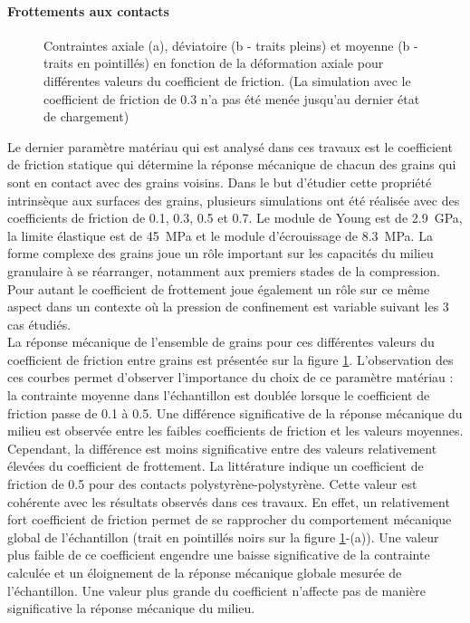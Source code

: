 	\paragraph{Frottements aux contacts\\}
		\begin{figure}\centering
			\hfill
			\caption{\label{fig06:material_effect_friction}Contraintes axiale (a), déviatoire (b - traits pleins) et moyenne (b - traits en pointillés) en fonction de la déformation axiale pour différentes valeurs du coefficient de friction. (La simulation avec le coefficient de friction de \num{0.3} n'a pas été menée jusqu'au dernier état de chargement)}
		\end{figure}
		Le dernier paramètre matériau qui est analysé dans ces travaux est le coefficient de friction statique qui détermine la réponse mécanique de chacun des grains qui sont en contact avec des grains voisins. Dans le but d'étudier cette propriété intrinsèque aux surfaces des grains, plusieurs simulations ont été réalisée avec des coefficients de friction de \num{0.1}, \num{0.3}, \num{0.5} et \num{0.7}. Le module de Young est de \SI{2.9}{\giga\pascal}, la limite élastique est de \SI{45}{\mega\pascal} et le module d'écrouissage de \SI{8.3}{\mega\pascal}. La forme complexe des grains joue un rôle important sur les capacités du milieu granulaire à se réarranger, notamment aux premiers stades de la compression. Pour autant le coefficient de frottement joue également un rôle sur ce même aspect dans un contexte où la pression de confinement est variable suivant les 3 cas étudiés.
		\\La réponse mécanique de l'ensemble de grains pour ces différentes valeurs du coefficient de friction entre grains est présentée sur la figure \ref{fig06:material_effect_friction}. L'observation des ces courbes permet d'observer l'importance du choix de ce paramètre matériau : la contrainte moyenne dans l'échantillon est doublée lorsque le coefficient de friction passe de \num{0.1} à \num{0.5}. Une différence significative de la réponse mécanique du milieu est observée entre les faibles coefficients de friction et les valeurs moyennes. Cependant, la différence est moins significative entre des valeurs relativement élevées du coefficient de frottement. La littérature \citep{wypych_handbook_2016, matweb} indique un coefficient de friction de \num{0.5} pour des contacts polystyrène-polystyrène. Cette valeur est cohérente avec les résultats observés dans ces travaux. En effet, un relativement fort coefficient de friction permet de se rapprocher du comportement mécanique global de l'échantillon (trait en pointillés noirs sur la figure \ref{fig06:material_effect_friction}-(a)). Une valeur plus faible de ce coefficient engendre une baisse significative de la contrainte calculée et un éloignement de la réponse mécanique globale mesurée de l'échantillon. Une valeur plus grande du coefficient n'affecte pas de manière significative la réponse mécanique du milieu.
		
